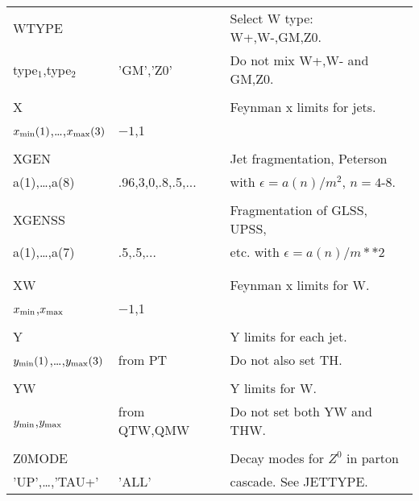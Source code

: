 \newpage
\begin{center}
\begin{tabular}{lll}
\hline\hline
WTYPE                  &                   & Select W type: W+,W-,GM,Z0.    \\
type$_1$,type$_2$      & 'GM','Z0'         & Do not mix W+,W- and GM,Z0.    \\
                       &                   &                                \\
X                      &                   & Feynman x limits for jets.     \\
$x_{\rm min}(1)$,\dots,$x_{\rm max}(3)$ & 
$-1$,1                                     &                                \\
                       &                   &                                \\
XGEN                   &                   & Jet fragmentation, Peterson    \\
a(1),\dots,a(8)        & .96,3,0,.8,.5,... & with $\epsilon=a(n)/m^2$, 
$n=4$-8.                                                                    \\
                       &                   &                                \\
XGENSS                 &                   & Fragmentation of GLSS, UPSS,   \\
a(1),\dots,a(7)        & .5,.5,...         & etc. with $\epsilon=a(n)/m**2$ \\
                       &                   &                                \\
                       &                   &                                \\
XW                     &                   & Feynman x limits for W.        \\
$x_{\rm min}$,$x_{\rm max}$ & $-1$,1       &                                \\
                       &                   &                                \\
Y                      &                   & Y limits for each jet.         \\
$y_{\rm min}(1)$,\dots,$y_{\rm max}(3)$ & from PT & Do not also set TH.     \\
                       &                   &                                \\
YW                     &                   & Y limits for W.                \\
$y_{\rm min}$,$y_{\rm max}$ & from QTW,QMW & Do not set both YW and THW.    \\
                       &                   &                                \\
Z0MODE                 &                   & Decay modes for $Z^0$ in parton\\
'UP',\dots,'TAU+'      & 'ALL'             & cascade. See JETTYPE.          \\
\hline\hline
\end{tabular}
\end{center}

